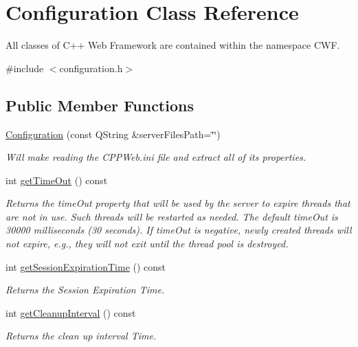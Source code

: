 \hypertarget{class_configuration}{}\section{Configuration Class Reference}
\label{class_configuration}


All classes of C++ Web Framework are contained within the namespace C\+WF.  




{\ttfamily \#include $<$configuration.\+h$>$}

\subsection*{Public Member Functions}
\begin{DoxyCompactItemize}
\item 
\hyperlink{class_configuration_a60b4858740fb32114fa5f4e72577fa7a}{Configuration} (const Q\+String \&server\+Files\+Path=\char`\"{}\char`\"{})
\begin{DoxyCompactList}\small\item\em Will make reading the C\+P\+P\+Web.\+ini file and extract all of its properties. \end{DoxyCompactList}\item 
int \hyperlink{class_configuration_a3cd126ebe20117c04b4d38797e06551d}{get\+Time\+Out} () const
\begin{DoxyCompactList}\small\item\em Returns the time\+Out property that will be used by the server to expire threads that are not in use. Such threads will be restarted as needed. The default time\+Out is 30000 milliseconds (30 seconds). If time\+Out is negative, newly created threads will not expire, e.\+g., they will not exit until the thread pool is destroyed. \end{DoxyCompactList}\item 
int \hyperlink{class_configuration_af14b4f22fdcdfc32fbcac712a9868fd4}{get\+Session\+Expiration\+Time} () const
\begin{DoxyCompactList}\small\item\em Returns the Session Expiration Time. \end{DoxyCompactList}\item 
int \hyperlink{class_configuration_a6a592b2194d4059f31aaf4223ee2e70e}{get\+Cleanup\+Interval} () const
\begin{DoxyCompactList}\small\item\em Returns the clean up interval Time. \end{DoxyCompactList}\item 

\end{DoxyCompactItemize}
